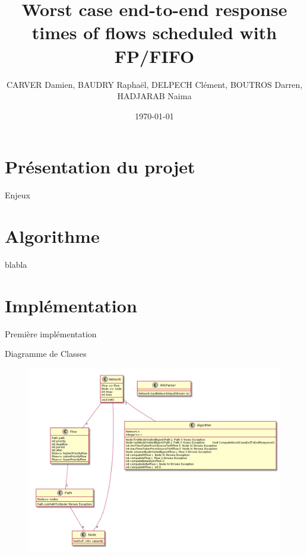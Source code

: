 \documentclass{beamer}
\begin{document}
\title{Worst case end-to-end response times of flows scheduled with FP/FIFO}

\author[]{CARVER Damien, BAUDRY Raphaël, DELPECH Clément, BOUTROS Darren, 
HADJARAB Naima}
\date{\today}
\frame{\titlepage} 

\section{Présentation du projet}
\begin{frame}{Enjeux}

\end{frame}


\section{Algorithme}
\begin{frame}{blabla}
 
\end{frame}


\section{Implémentation}
\begin{frame}{Première implémentation}

\end{frame}

\begin{frame}{Diagramme de Classes}
  \begin{figure}
    \includegraphics[scale=0.3]{../Rendu3/ClassDiagram.png}
  \end{figure}
\end{frame}
\end{document}
